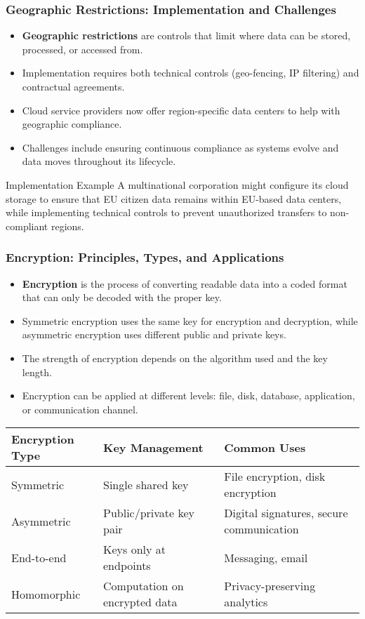 \documentclass{beamer}
\begin{document}
\begin{frame}
\frametitle{Geographic Restrictions: Implementation and Challenges}
\begin{itemize}
\item \textbf{Geographic restrictions} are controls that limit where data can be stored, processed, or accessed from.
\item Implementation requires both technical controls (geo-fencing, IP filtering) and contractual agreements.
\item Cloud service providers now offer region-specific data centers to help with geographic compliance.
\item Challenges include ensuring continuous compliance as systems evolve and data moves throughout its lifecycle.
\end{itemize}

\begin{exampleblock}{Implementation Example}
A multinational corporation might configure its cloud storage to ensure that EU citizen data remains within EU-based data centers, while implementing technical controls to prevent unauthorized transfers to non-compliant regions.
\end{exampleblock}
\end{frame}

\begin{frame}
\frametitle{Encryption: Principles, Types, and Applications}
\begin{itemize}
\item \textbf{Encryption} is the process of converting readable data into a coded format that can only be decoded with the proper key.
\item Symmetric encryption uses the same key for encryption and decryption, while asymmetric encryption uses different public and private keys.
\item The strength of encryption depends on the algorithm used and the key length.
\item Encryption can be applied at different levels: file, disk, database, application, or communication channel.
\end{itemize}

\scriptsize

\begin{table}
\begin{tabular}{|l|l|l|}
\hline
\textbf{Encryption Type} & \textbf{Key Management} & \textbf{Common Uses} \\
\hline
Symmetric & Single shared key & File encryption, disk encryption \\
\hline
Asymmetric & Public/private key pair & Digital signatures, secure communication \\
\hline
End-to-end & Keys only at endpoints & Messaging, email \\
\hline
Homomorphic & Computation on encrypted data & Privacy-preserving analytics \\
\hline
\end{tabular}
\end{table}
\end{frame}
\end{document}
